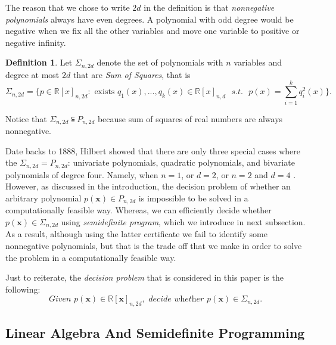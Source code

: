 \documentclass[12pt]{amsart}
\numberwithin{equation}{section}
\theoremstyle{definition}
\newtheorem{definition}[thm]{Definition}
\numberwithin{thm}{section}
\begin{document}
The reason that we chose to write $2d$ in the definition is that \emph{nonnegative polynomials} always have even degrees.
A polynomial with odd degree would be negative when we fix all the other variables and move one variable to positive or negative infinity. 

\begin{definition}
     \label{def:SOS}
          Let $\Sigma_{n,2d}$ denote the set of polynomials with $n$ variables and degree at most
          $2d$ that are \emph{Sum of Squares}, that is
          \begin{equation*}
               \Sigma_{n, 2d} = \{ p \in \mathbb{R}[x]_{n, 2d}: \text{ exists } q_1(x), ..., q_k(x) \in \mathbb{R}[x]_{n,d} \text{ } s.t. \text{ }  p(x) = \sum_{i=1}^k q_i^2(x)\}.
          \end{equation*}     
\end{definition}

Notice that $\Sigma_{n,2d} \subseteqq P_{n, 2d}$ because sum of squares of real numbers are always nonnegative. 

Date backs to 1888, Hilbert showed that there are only three special cases where the $\Sigma_{n,2d} = P_{n, 2d}$: 
univariate polynomials, quadratic polynomials, and bivariate polynomials of degree four. Namely, when $n = 1$, or $d = 2$, or $n = 2$ and $d = 4$ \cite{Reznick96someconcrete}.
However, as discussed in the introduction, the decision problem of whether an arbitrary polynomial $p(\mathbf{x}) \in P_{n, 2d}$ is impossible to be solved in a computationally feasible way.
Whereas, we can efficiently decide whether $p(\mathbf{x}) \in \Sigma_{n, 2d}$ using \emph{semidefinite program}, which we introduce in next subsection. 
As a result, although using the latter certificate we fail to identify some nonnegative polynomials, but that is the trade off that we make in order to solve the problem in a computationally feasible way.

Just to reiterate, the \emph{decision problem} that is considered in this paper is the following: 
\begin{equation}
     \textit{Given } p(\mathbf{x}) \in \mathbb{R}[\mathbf{x}]_{n, 2d}, \textit{ decide whether } p(\mathbf{x}) \in \Sigma_{n, 2d} \label{eq:dp}.
\end{equation}




\subsection{Linear Algebra And Semidefinite Programming}
\label{Sec:Linear Algebra}
\end{document}
